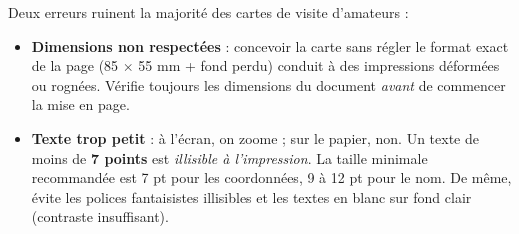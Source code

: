 \documentclass[11pt]{article}
\begin{document}
\begin{attention}
Deux erreurs ruinent la majorité des cartes de visite d'amateurs :
\begin{itemize}
\item \textbf{Dimensions non respectées} : concevoir la carte sans régler le format exact de la page (85 $\times$ 55 mm + fond perdu) conduit à des impressions déformées ou rognées. Vérifie toujours les dimensions du document \emph{avant} de commencer la mise en page.
\item \textbf{Texte trop petit} : à l'écran, on zoome ; sur le papier, non. Un texte de moins de \textbf{7 points} est \emph{illisible à l'impression}. La taille minimale recommandée est 7 pt pour les coordonnées, 9 à 12 pt pour le nom. De même, évite les polices fantaisistes illisibles et les textes en blanc sur fond clair (contraste insuffisant).
\end{itemize}
\end{attention}
\end{document}
